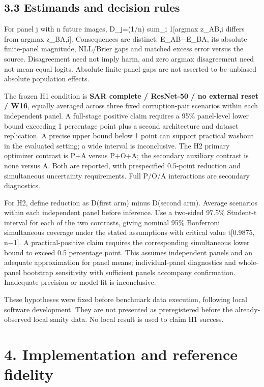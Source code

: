\documentclass[11pt]{article}
\begin{document}
\subsection*{3.3 Estimands and decision rules}

For panel j with n future images, D\_j=(1/n) sum\_i 1[argmax z\_AB,i differs from argmax z\_BA,i]. Consequences are distinct: E\_AB\ensuremath{-}E\_BA, its absolute finite-panel magnitude, NLL/Brier gaps and matched excess error versus the source. Disagreement need not imply harm, and zero argmax disagreement need not mean equal logits. Absolute finite-panel gaps are not asserted to be unbiased absolute population effects.

The frozen H1 condition is \textbf{SAR complete / ResNet-50 / no external reset / W16}, equally averaged across three fixed corruption-pair scenarios within each independent panel. A full-stage positive claim requires a 95\% panel-level lower bound exceeding 1 percentage point plus a second architecture and dataset replication. A precise upper bound below 1 point can support practical washout in the evaluated setting; a wide interval is inconclusive. The H2 primary optimizer contrast is P+A versus P+O+A; the secondary auxiliary contrast is none versus A. Both are reported, with prespecified 0.5-point reduction and simultaneous uncertainty requirements. Full P/O/A interactions are secondary diagnostics.

For H2, define reduction as D(first arm) minus D(second arm). Average scenarios within each independent panel before inference. Use a two-sided 97.5\% Student-t interval for each of the two contrasts, giving nominal 95\% Bonferroni simultaneous coverage under the stated assumptions with critical value t[0.9875, n\ensuremath{-}1]. A practical-positive claim requires the corresponding simultaneous lower bound to exceed 0.5 percentage point. This assumes independent panels and an adequate approximation for panel means; individual-panel diagnostics and whole-panel bootstrap sensitivity with sufficient panels accompany confirmation. Inadequate precision or model fit is inconclusive.

These hypotheses were fixed before benchmark data execution, following local software development. They are not presented as preregistered before the already-observed local sanity data. No local result is used to claim H1 success.

\section*{4. Implementation and reference fidelity}
\end{document}
